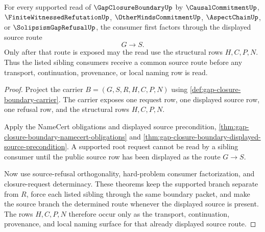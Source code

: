 \begin{theorem}
\label{thm:gap-closure-boundary-sibling-source-totality}
For every supported read of $\GapClosureBoundaryUp$ by $\CausalCommitmentUp$, $\FiniteWitnessedRefutationUp$, $\OtherMindsCommitmentUp$, $\AspectChainUp$, or $\SolipsismGapRefusalUp$, the consumer first factors through the displayed source route
$$
G \longrightarrow S.
$$
Only after that route is exposed may the read use the structural rows $H,C,P,N$. Thus the listed sibling consumers receive a common source route before any transport, continuation, provenance, or local naming row is read.
\end{theorem}
\begin{proof}
Project the carrier $B=(G,S,R,H,C,P,N)$ using \autoref{def:gap-closure-boundary-carrier}. The carrier exposes one request row, one displayed source row, one refusal row, and the structural rows $H,C,P,N$.

Apply the NameCert obligations and displayed source precondition, \autoref{thm:gap-closure-boundary-namecert-obligations} and \autoref{thm:gap-closure-boundary-displayed-source-precondition}. A supported root request cannot be read by a sibling consumer until the public source row has been displayed as the route $G \longrightarrow S$.

Now use source-refusal orthogonality, hard-problem consumer factorization, and closure-request determinacy. These theorems keep the supported branch separate from $R$, force each listed sibling through the same boundary packet, and make the source branch the determined route whenever the displayed source is present. The rows $H,C,P,N$ therefore occur only as the transport, continuation, provenance, and local naming surface for that already displayed source route.
\end{proof}

